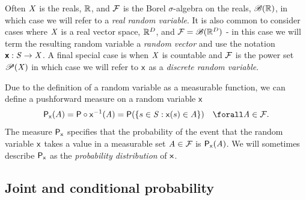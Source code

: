 Often $\mathit{X}$ is the reals, $\mathbb{R}$, and $\mathcal{F}$ is the Borel $\sigma$-algebra on the reals, $\mathscr{B}(\mathbb{R})$, in which case we will refer to a \emph{real random variable}. It is also common to consider cases where $\mathit{X}$ is a real vector space, $\mathbb{R}^D$, and $\mathcal{F} = \mathscr{B}(\mathbb{R}^D)$ - in this case we will term the resulting random variable a \emph{random vector} and use the notation $\boldsymbol{\mathsf{x}} : \mathit{S} \to \mathit{X}$. A final special case is when $\mathit{X}$ is countable and $\mathcal{F}$ is the power set $\mathscr{P}(\mathit{X})$ in which case we will refer to $\mathsf{x}$ as a \emph{discrete random variable}.

Due to the definition of a random variable as a measurable function, we can define a pushforward measure on a random variable $\mathsf{x}$
\begin{equation}
  \prob{\rvar{x}}(A) 
  = \probability\circ\rvar{x}^{-1}(\set{A})
  = \probability\lpa \lbr s \in \set{S}: \rvar{x}(s) \in A \rbr \rpa
  \quad \forall \set{A} \in \sset{F}.
\end{equation}
The measure $\mathsf{P}_{\mathsf{x}}$ specifies that the probability of the event that the random variable $\mathsf{x}$ takes a value in a measurable set $\mathit{A} \in \mathcal{F}$ is $\mathsf{P}_{\mathsf{x}}(\mathit{A})$. We will sometimes describe $\mathsf{P}_{\mathsf{x}}$ as the \emph{probability distribution} of $\mathsf{x}$.


\subsection{Joint and conditional probability}\label{subsec:joint-and-conditional-probabilities}

